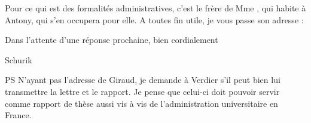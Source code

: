\documentclass[11pt,a4paper]{article}
\begin{document}
Pour ce qui est des formalités administratives, c'est le frère de Mme
, qui habite à Antony, qui s'en occupera pour elle.
A toutes fin utile, je vous passe son adresse :


Dans l'attente d'une réponse prochaine, bien cordialement

Schurik


PS N'ayant pas l'adresse de Giraud, je demande à Verdier s'il peut bien lui
transmettre la lettre et le rapport. Je pense que celui-ci doit pouvoir
servir comme rapport de thèse aussi vis à vis de l'administration
universitaire en France.
\end{document}
